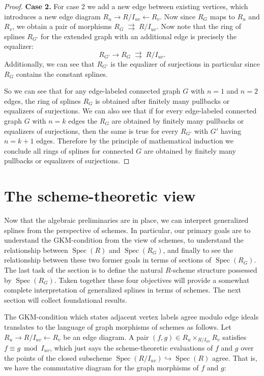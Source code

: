 \documentclass{article}
\DeclareMathOperator{\Spec}{Spec}
\begin{document}
\begin{proof}
\textbf{Case 2.} For case 2 we add a new edge between existing vertices, which introduces a new edge diagram $R_u \rightarrow R/I_{uv} \leftarrow R_v$. Now since $R_{G}$ maps to $R_u$ and $R_v$, we obtain a pair of morphisms $R_{G} \;\rightrightarrows\; R/I_{uv}$. Now note that the ring of splines $R_{G'}$ for the extended graph with an additional edge is precisely the equalizer:
\[
R_{G'} \rightarrow R_{G} \;\rightrightarrows\; R/I_{uv}.
\]
Additionally, we can see that $R_{G'}$ is the equalizer of surjections in particular since $R_{G}$ contains the constant splines.

So we can see that for any edge-labeled connected graph $G$ with $n=1$ and $n=2$ edges, the ring of splines $R_{G}$ is obtained after finitely many pullbacks or equalizers of surjections. We can also see that if for every edge-labeled connected graph $G$ with $n=k$ edges the $R_{G}$ are obtained by finitely many pullbacks or equalizers of surjections, then the same is true for every $R_{G'}$ with $G'$ having $n=k+1$ edges. Therefore by the principle of mathematical induction we conclude all rings of splines for connected $G$ are obtained by finitely many pullbacks or equalizers of surjections.
\end{proof}

\section{The scheme-theoretic view}\label{sec:pushouts}
Now that the algebraic preliminaries are in place, we can interpret generalized splines from the perspective of schemes. In particular, our primary goals are to understand the GKM-condition from the view of schemes, to understand the relationship between $\Spec(R)$ and $\Spec(R_G)$, and finally to see the relationship between these two former goals in terms of sections of $\Spec(R_G)$. The last task of the section is to define the natural $R$-scheme structure possessed by $\Spec(R_G)$. Taken together these four objectives will provide a somewhat complete interpretation of generalized splines in terms of schemes.  The next section will collect foundational results.

The GKM-condition which states adjacent vertex labels agree modulo edge ideals translates to the language of graph morphisms of schemes as follows. Let $R_u \rightarrow R/I_{uv} \leftarrow R_v$ be an edge diagram. A pair $(f, g) \in R_u \times_{R/I_{uv}} R_v$ satisfies $f \equiv g \bmod I_{uv}$, which just says the scheme-theoretic evaluations of $f$ and $g$ over the points of the closed subscheme $\Spec(R/I_{uv}) \hookrightarrow \Spec(R)$ agree. That is, we have the commutative diagram for the graph morphisms of $f$ and $g$:
\end{document}
